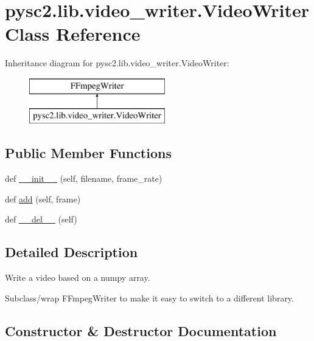\hypertarget{classpysc2_1_1lib_1_1video__writer_1_1_video_writer}{}\section{pysc2.\+lib.\+video\+\_\+writer.\+Video\+Writer Class Reference}
\label{classpysc2_1_1lib_1_1video__writer_1_1_video_writer}
Inheritance diagram for pysc2.\+lib.\+video\+\_\+writer.\+Video\+Writer\+:\begin{figure}[H]
\begin{center}
\leavevmode
\includegraphics[height=2.000000cm]{classpysc2_1_1lib_1_1video__writer_1_1_video_writer}
\end{center}
\end{figure}
\subsection*{Public Member Functions}
\begin{DoxyCompactItemize}
\item 
def \mbox{\hyperlink{classpysc2_1_1lib_1_1video__writer_1_1_video_writer_ae35acadbcec61c071b73153b7a9445fb}{\+\_\+\+\_\+init\+\_\+\+\_\+}} (self, filename, frame\+\_\+rate)
\item 
def \mbox{\hyperlink{classpysc2_1_1lib_1_1video__writer_1_1_video_writer_ac32683874f9d26bee99afc7806940cd6}{add}} (self, frame)
\item 
def \mbox{\hyperlink{classpysc2_1_1lib_1_1video__writer_1_1_video_writer_a7dfc204b28452a4b51ad4a8b4a91a573}{\+\_\+\+\_\+del\+\_\+\+\_\+}} (self)
\end{DoxyCompactItemize}


\subsection{Detailed Description}
\begin{DoxyVerb}Write a video based on a numpy array.

Subclass/wrap FFmpegWriter to make it easy to switch to a different library.
\end{DoxyVerb}
 

\subsection{Constructor \& Destructor Documentation}
\mbox{\label{classpysc2_1_1lib_1_1video__writer_1_1_video_writer_ae35acadbcec61c071b73153b7a9445fb}} 
